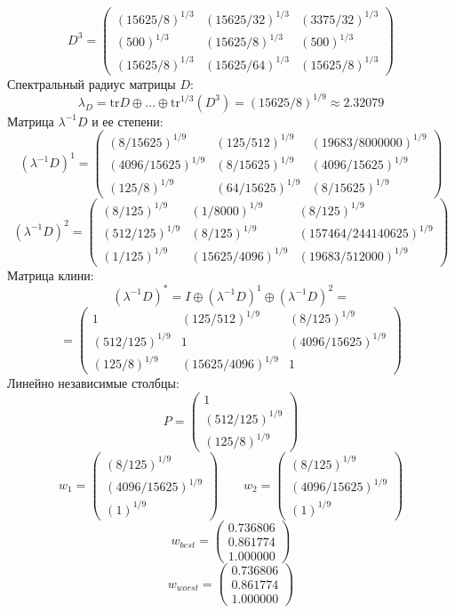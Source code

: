 $$D^3 = \begin{pmatrix}
(15625/8)^{1/3} & (15625/32)^{1/3} & (3375/32)^{1/3}\\
(500)^{1/3} & (15625/8)^{1/3} & (500)^{1/3}\\
(15625/8)^{1/3} & (15625/64)^{1/3} & (15625/8)^{1/3}
\end{pmatrix}
$$
Спектральный радиус матрицы $D$:
$$\lambda_{D} = \mathrm{tr}D\oplus \dots \oplus \mathrm{tr}^{1/3}(D^{3}) = (15625/8)^{1/9} \approx 2.32079$$
Матрица $\lambda^{-1}D$ и ее степени:
$$(\lambda^{-1}D)^1 = \begin{pmatrix}
(8/15625)^{1/9} & (125/512)^{1/9} & (19683/8000000)^{1/9}\\
(4096/15625)^{1/9} & (8/15625)^{1/9} & (4096/15625)^{1/9}\\
(125/8)^{1/9} & (64/15625)^{1/9} & (8/15625)^{1/9}
\end{pmatrix}
$$
$$(\lambda^{-1}D)^2 = \begin{pmatrix}
(8/125)^{1/9} & (1/8000)^{1/9} & (8/125)^{1/9}\\
(512/125)^{1/9} & (8/125)^{1/9} & (157464/244140625)^{1/9}\\
(1/125)^{1/9} & (15625/4096)^{1/9} & (19683/512000)^{1/9}
\end{pmatrix}
$$
Матрица клини:
$$(\lambda^{-1}D)^* = I \oplus (\lambda^{-1}D)^1 \oplus (\lambda^{-1}D)^2 = $$
$$ = \begin{pmatrix}
1 & (125/512)^{1/9} & (8/125)^{1/9}\\
(512/125)^{1/9} & 1 & (4096/15625)^{1/9}\\
(125/8)^{1/9} & (15625/4096)^{1/9} & 1
\end{pmatrix}
$$
Линейно независимые столбцы:
$$P = \begin{pmatrix}
1\\
(512/125)^{1/9}\\
(125/8)^{1/9}
\end{pmatrix}
$$
$$w_1 = \begin{pmatrix}
(8/125)^{1/9}\\
(4096/15625)^{1/9}\\
(1)^{1/9}
\end{pmatrix}
\qquad w_2 = \begin{pmatrix}
(8/125)^{1/9}\\
(4096/15625)^{1/9}\\
(1)^{1/9}
\end{pmatrix}
$$
$$w_{best} = \begin{pmatrix}
0.736806\\
0.861774\\
1.000000
\end{pmatrix}
$$
$$w_{worst} = \begin{pmatrix}
0.736806\\
0.861774\\
1.000000
\end{pmatrix}
$$
